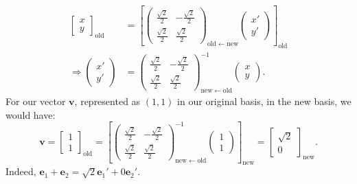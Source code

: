 \documentclass[../master.tex]{subfiles}
\begin{document}
	\begin{equation*}
		\begin{aligned}
			\begin{bmatrix}
				x\\
				y
			\end{bmatrix}_{\mathrm{old}}
			&= \left[ \begin{pmatrix}
					 \frac{\sqrt 2}{2} &  -\frac{\sqrt 2}{2} \\
					 \frac{\sqrt 2}{2} &  \frac{\sqrt 2}{2}
				\end{pmatrix}_{\mathrm{old} \leftarrow \mathrm{new}}
				\begin{pmatrix}
					x'\\
					y'
				\end{pmatrix}
			 \right]_{\mathrm{old}}\\ \Rightarrow 
			 \begin{pmatrix}
			 	x'\\
				y'
			 \end{pmatrix} 
			 &= \begin{pmatrix}
					 \frac{\sqrt 2}{2} &  -\frac{\sqrt 2}{2} \\
					 \frac{\sqrt 2}{2} &  \frac{\sqrt 2}{2}
			\end{pmatrix}^{-1}_{\mathrm{new} \leftarrow \mathrm{old}}
			\begin{pmatrix}
				x\\
				y
			\end{pmatrix}.
		\end{aligned}
	\end{equation*}
	For our vector $\mathbf v$, represented as $(1,1)$ in our original basis, in the new basis, we would have:
	\begin{equation*}
		\mathbf v = \begin{bmatrix}
			1 \\ 1
		\end{bmatrix}_{\mathrm{old}}
		= \left[ \begin{pmatrix}
			 \frac{\sqrt 2}{2} &  -\frac{\sqrt 2}{2} \\
			 \frac{\sqrt 2}{2} &  \frac{\sqrt 2}{2}
		\end{pmatrix}^{-1}_{\mathrm{new} \leftarrow \mathrm{old}} 
		\begin{pmatrix}
			1 \\ 1
		\end{pmatrix}\right]_\mathrm{new}
		= \begin{bmatrix}
			\sqrt 2 \\ 0
		\end{bmatrix}_{\mathrm{new}}.
	\end{equation*}
	Indeed, $\mathbf e_1 + \mathbf e_2 = \sqrt 2 \mathbf e_1' + 0 \mathbf e_2'$.\\
			
\end{document}
